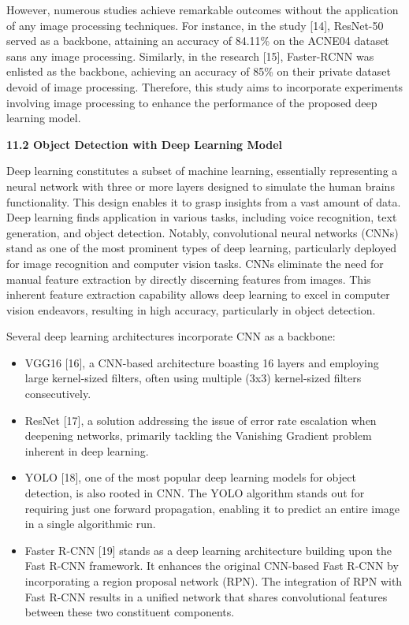 \documentclass[16pt]{extarticle}
\begin{document}
However, numerous studies achieve remarkable outcomes without the
application of any image processing techniques. For instance, in the
study {[}14{]}, ResNet-50 served as a backbone, attaining an accuracy of
84.11\% on the ACNE04 dataset sans any image processing. Similarly, in
the research {[}15{]}, Faster-RCNN was enlisted as the backbone,
achieving an accuracy of 85\% on their private dataset devoid of image
processing. Therefore, this study aims to incorporate experiments
involving image processing to enhance the performance of the proposed
deep learning model.

\textbf{11.2 Object Detection with Deep Learning Model}

Deep learning constitutes a subset of machine learning, essentially
representing a neural network with three or more layers designed to
simulate the human brain\textquotesingle s functionality. This design
enables it to grasp insights from a vast amount of data. Deep learning
finds application in various tasks, including voice recognition, text
generation, and object detection. Notably, convolutional neural networks
(CNNs) stand as one of the most prominent types of deep learning,
particularly deployed for image recognition and computer vision tasks.
CNNs eliminate the need for manual feature extraction by directly
discerning features from images. This inherent feature extraction
capability allows deep learning to excel in computer vision endeavors,
resulting in high accuracy, particularly in object detection.

Several deep learning architectures incorporate CNN as a backbone:

\begin{itemize}
\item
  VGG16 {[}16{]}, a CNN-based architecture boasting 16 layers and
  employing large kernel-sized filters, often using multiple (3x3)
  kernel-sized filters consecutively.
\item
  ResNet {[}17{]}, a solution addressing the issue of error rate
  escalation when deepening networks, primarily tackling the Vanishing
  Gradient problem inherent in deep learning.
\item
  YOLO {[}18{]}, one of the most popular deep learning models for object
  detection, is also rooted in CNN. The YOLO algorithm stands out for
  requiring just one forward propagation, enabling it to predict an
  entire image in a single algorithmic run.
\item
  Faster R-CNN {[}19{]} stands as a deep learning architecture building
  upon the Fast R-CNN framework. It enhances the original CNN-based Fast
  R-CNN by incorporating a region proposal network (RPN). The
  integration of RPN with Fast R-CNN results in a unified network that
  shares convolutional features between these two constituent
  components.
\end{itemize}
\end{document}
